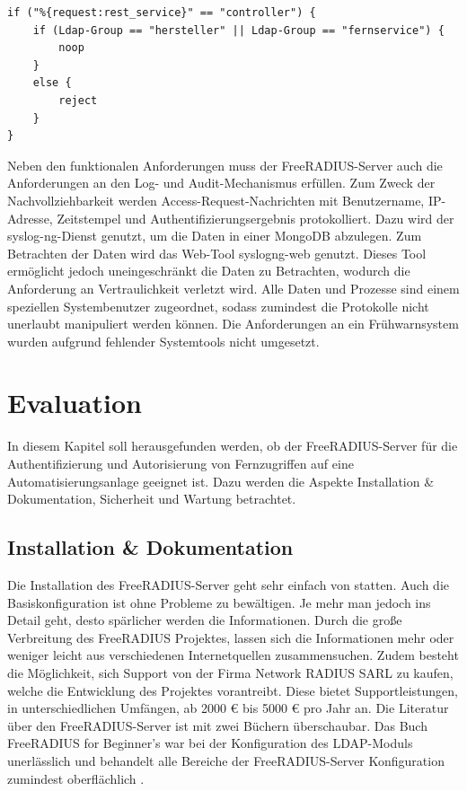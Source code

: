 \documentclass[11pt,a4paper]{report}
\begin{document}
\begin{lstlisting}[caption=Richtlinie für den controller-Service, label=lst:policy]
if ("%{request:rest_service}" == "controller") {
    if (Ldap-Group == "hersteller" || Ldap-Group == "fernservice") {
        noop
    }
    else {
        reject
    }
}
\end{lstlisting}

Neben den funktionalen Anforderungen muss der FreeRADIUS-Server auch die Anforderungen an den Log- und Audit-Mechanismus erfüllen. Zum Zweck der Nachvollziehbarkeit werden Access-Request-Nachrichten mit Benutzername, IP-Adresse, Zeitstempel und Authentifizierungsergebnis protokolliert. Dazu wird der syslog-ng-Dienst genutzt, um die Daten in einer MongoDB abzulegen. Zum Betrachten der Daten wird das Web-Tool syslogng-web genutzt. Dieses Tool ermöglicht jedoch uneingeschränkt die Daten zu Betrachten, wodurch die Anforderung an Vertraulichkeit verletzt wird. Alle Daten und Prozesse sind einem speziellen Systembenutzer zugeordnet, sodass zumindest die Protokolle nicht unerlaubt manipuliert werden können. Die Anforderungen an ein Frühwarnsystem wurden aufgrund fehlender Systemtools nicht umgesetzt.

\chapter{Evaluation} \label{chap:evaluation}

In diesem Kapitel soll herausgefunden werden, ob der FreeRADIUS-Server für die Authentifizierung und Autorisierung von Fernzugriffen auf eine Automatisierungsanlage geeignet ist. Dazu werden die Aspekte Installation \& Dokumentation, Sicherheit und Wartung betrachtet.

\section{Installation \& Dokumentation}

Die Installation des FreeRADIUS-Server geht sehr einfach von statten. Auch die Basiskonfiguration ist ohne Probleme zu bewältigen. Je mehr man jedoch ins Detail geht, desto spärlicher werden die Informationen. Durch die große Verbreitung des FreeRADIUS Projektes, lassen sich die Informationen mehr oder weniger leicht aus verschiedenen Internetquellen zusammensuchen. Zudem besteht die Möglichkeit, sich Support von der Firma Network RADIUS SARL zu kaufen, welche die Entwicklung des Projektes vorantreibt. Diese bietet Supportleistungen, in unterschiedlichen Umfängen, ab 2000 € bis 5000 € pro Jahr an. Die Literatur über den FreeRADIUS-Server ist mit zwei Büchern  überschaubar. Das Buch FreeRADIUS for Beginner's war bei der Konfiguration des LDAP-Moduls unerlässlich und behandelt alle Bereiche der FreeRADIUS-Server Konfiguration zumindest oberflächlich \cite{walt}. 
\end{document}
